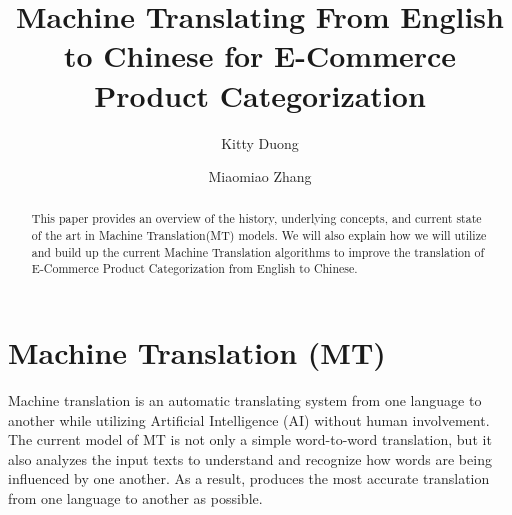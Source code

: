 \documentclass[sigconf]{acmart}
\begin{document}
\title{Machine Translating From English to Chinese for E-Commerce Product Categorization}
\author{Kitty Duong}

\author{Miaomiao Zhang}

\begin{abstract}
    This paper provides an overview of the history, underlying concepts, and current state of the art in Machine Translation(MT) models. We will also explain how we will utilize and build up the current Machine Translation algorithms to improve the translation of E-Commerce Product Categorization from English to Chinese.
\end{abstract}
\maketitle

\section{Machine Translation (MT)}
    Machine translation is an automatic translating system from one language to another while utilizing Artificial Intelligence (AI) without human involvement. The current model of MT is not only a simple word-to-word translation, but it also analyzes the input texts to understand and recognize how words are being influenced by one another. As a result, produces the most accurate translation from one language to another as possible\cite{Amazon_MT}.
    
\end{document}
